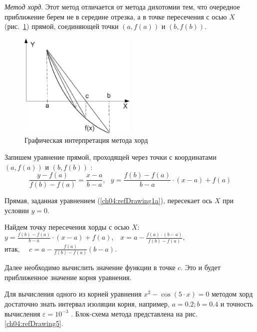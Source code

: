 \emph{Метод хорд}. Этот метод отличается от метода дихотомии тем, что очередное приближение берем не в
середине отрезка, а в точке пересечения с осью $X$ (рис.~\ref{ch04:refDrawing4}) прямой, соединяющей точки 
$(a,f(a))$ и  $(b,f(b))$.

\begin{figure}[htb]
\begin{center}
\includegraphics[width=0.5\textwidth]{img/ris_4_5}
\caption{Графическая интерпретация метода хорд}
\label{ch04:refDrawing4}
\end{center}
\end{figure}

Запишем уравнение прямой, проходящей через точки с координатами   $(a,f(a))$  и  $(b,f(b))$ :
\begin{equation}\label{ch04:refDrawing1a}
\frac{y-f(a)}{f(b)-f(a)}=\frac{x-a}{b-a},\ \ \  y=\frac{f(b)-f(a)}{b-a}\cdot (x-a)+f(a)
\end{equation}

Прямая, заданная уравнением (\ref{ch04:refDrawing1a}), пересекает ось $X$ при условии $y=0$.

Найдем точку пересечения хорды с осью $X$:\\
${y=\frac{f(b)-f(a)}{b-a}\cdot (x-a)+f(a)}$,\ \  ${x=a-\frac{f(a)\cdot (b-a)}{f(b)-f(a)}}$,\\ 
итак, \ \  ${c=a-\frac{f(a)}{f(b)-f(a)}(b-a)}$.

Далее необходимо вычислить значение функции в точке $c$. Это и будет приближенное значение корня
уравнения.

Для вычисления одного из корней уравнения  $x^2-\cos (5\cdot x)=0$  методом хорд достаточно знать интервал изоляции
корня, например,  $a=0.2;b=0.4$  и точность вычисления  $\varepsilon=10^{-3}$ . Блок-схема метода представлена на рис.
\ref{ch04:refDrawing5}. 

